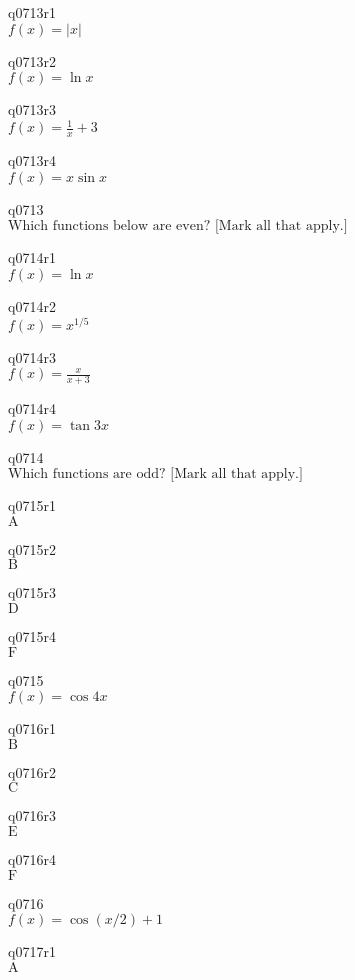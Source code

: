 q0713r1\\
\(\displaystyle f(x) = |x| \)

q0713r2\\
\(\displaystyle f(x) = \ln x \)

q0713r3\\
\(\displaystyle f(x) = \frac{1}{x} + 3 \)

q0713r4\\
\(\displaystyle f(x) = x \sin x \)

q0713\\
\(\displaystyle \text{Which functions below are even? [Mark all that apply.]} \)

q0714r1\\
\(\displaystyle f(x) = \ln x \)

q0714r2\\
\(\displaystyle f(x) = x^{1/5} \)

q0714r3\\
\(\displaystyle f(x) = \frac{x}{x+3} \)

q0714r4\\
\(\displaystyle f(x) = \tan 3x \)

q0714\\
\(\displaystyle \text{Which functions are odd? [Mark all that apply.]} \)

q0715r1\\
\(\displaystyle \text{A} \)

q0715r2\\
\(\displaystyle \text{B} \)

q0715r3\\
\(\displaystyle \text{D} \)

q0715r4\\
\(\displaystyle \text{F} \)

q0715\\
\(\displaystyle f(x) = \cos 4x \)

q0716r1\\
\(\displaystyle \text{B} \)

q0716r2\\
\(\displaystyle \text{C} \)

q0716r3\\
\(\displaystyle \text{E} \)

q0716r4\\
\(\displaystyle \text{F} \)

q0716\\
\(\displaystyle f(x) = \cos(x/2) + 1 \)

q0717r1\\
\(\displaystyle \text{A} \)

